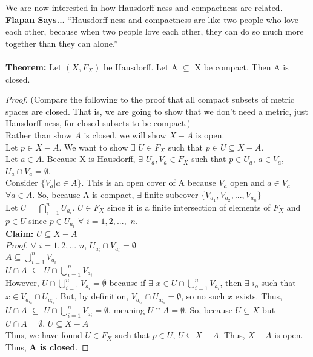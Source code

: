 \documentclass[11pt,reqno]{amsart}
\theoremstyle{definition}
\begin{document}
    We are now interested in how Hausdorff-ness and compactness are related.\\
    
    \indent
     \textbf{Flapan Says...} \textquotedblleft Hausdorff-ness and compactness are like two people who love each other, because when two people love each other, they can do so much more together than they can alone.\textquotedblright \\
     \\
     \indent
     \textbf{Theorem:} Let $(X, F_X)$ be Hausdorff. Let A $\subseteq$ X be compact. Then A is closed.\\
     
     \begin{proof} (Compare the following to the proof that all compact subsets of metric spaces are closed. That is, we are going to show that we don't need a metric, just Hausdorff-ness, for closed subsets to be compact.)\\
     \indent
     Rather than show $A$ is closed, we will show $X-A$ is open.\\
     \indent
     Let $p \in X-A$. We want to show $\exists$ $U \in F_X$ such that $p \in U \subseteq X-A$.\\
     \indent
     Let $a \in A$. Because X is Hausdorff, $\exists$ $U_a, V_a \in F_X$ such that $p \in U_a$, $a \in V_a$, $U_a \cap V_a = \emptyset$.\\
     \indent
     Consider $\{ V_a | a \in A\}$. This is an open cover of A because $V_a$ open and $a \in V_a$ $\forall a \in A$. So, because A is compact, $\exists$ finite subcover $\{ V_{a_1}, V_{a_2}, ..., V_{a_n}\}$\\
     \indent
     Let $U = \bigcap_{i=1}^{n} U_{a_i}$. $U \in F_X$ since it is a finite intersection of elements of $F_X$ and $p \in U$ since $p \in U_{a_i}$ $\forall$ $i=1, 2, ...,$ $n$.\\
     \indent
     \textbf{Claim:} $U \subseteq X-A$\\
     \emph{Proof.} $\forall$ $i=1, 2, ...$ $n$, $U_{a_i} \cap V_{a_i} = \emptyset$\\
     \indent
     $A \subseteq \bigcup_{i=1}^{n} V_{a_i}$\\
        \indent
     $U \cap A$ $\subseteq$ $U \cap \bigcup_{i=1}^{n} V_{a_i}$\\
     \indent
     However, $U \cap \bigcup_{i=1}^{n} V_{a_i} = \emptyset$ because if $\exists$ $x \in U \cap \bigcup_{i=1}^{n} V_{a_i}$, then $\exists$ $i_o$ such that $x \in V_{a_{i_o}} \cap U_{a_{i_o}}$. But, by definition, $V_{a_{i_o}} \cap U_{a_{i_o}} = \emptyset$, so no such $x$ exists. Thus,\\
     \indent
     $U  \cap A$ $\subseteq$ $U \cap \bigcup_{i=1}^{n} V_{a_i} = \emptyset$, meaning $U \cap A = \emptyset$. So, because $U \subseteq X$ but $U \cap A = \emptyset$, $U \subseteq X-A$\\
     \indent
     Thus, we have found $U \in F_X$ such that $p \in U$, $U \subseteq X-A$. Thus, $X-A$ is open.\\
     \indent
     Thus, \textbf{A is closed}.
     \end{proof}
     
\end{document}

